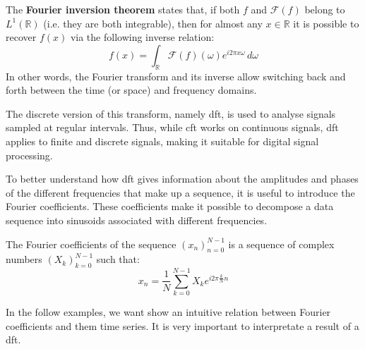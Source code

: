 \noindent The \textbf{Fourier inversion theorem} states that, if both $f$ and $\mathcal{F}(f)$ belong to $L^1(\mathbb{R})$ (i.e. they are both integrable), then for almost any $x\in\mathbb{R}$ it is possible to recover $f(x)$ via the following inverse relation:
\[
f(x)=\int_{\mathbb{R}}{\mathcal{F}\left(f\right)}(\omega)e^{i2\pi x\omega}\,d\omega
\]
In other words, the Fourier transform and its inverse allow switching back and forth between the time (or space) and frequency domains.

\bigskip
The discrete version of this transform, namely \gls{dft}, is used to analyse signals sampled at regular intervals. Thus, while \gls{cft} works on continuous signals, \gls{dft} applies to finite and discrete signals, making it suitable for digital signal processing.

\noindent To better understand how \gls{dft} gives information about the amplitudes and phases of the different frequencies that make up a sequence, it is useful to introduce the Fourier coefficients. These coefficients make it possible to decompose a data sequence into sinusoids associated with different frequencies.

\begin{modified}
\begin{remark}
	The Fourier coefficients of the sequence $(x_n)_{n=0}^{N-1}$ is a sequence of complex numbers $(X_k)_{k=0}^{N-1}$ such that:
	\begin{equation}
		x_n = \frac{1}{N}\sum_{k=0}^{N-1} X_k e^{i2\pi\frac{k}{N}n}
	\end{equation}

	\noindent In the follow examples, we want show an intuitive relation between Fourier coefficients and them time series. It is very important to interpretate a result of a \gls{dft}.
\end{remark}
\end{modified}

